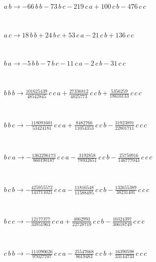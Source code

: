 \begin{minipage}{6in}
$
a\,
 b\rightarrow -66\,
 b\,
 b - 73\,
 b\,
 c - 219\,
 c\,
 a + 100\,
 c\,
 b - 476\,
 c\,
 c
$
\end{minipage}\medskip \\
\begin{minipage}{6in}
$
a\,
 c\rightarrow 18\,
 b\,
 b + 24\,
 b\,
 c + 53\,
 c\,
 a - 21\,
 c\,
 b + 136\,
 c\,
 c
$
\end{minipage}\medskip \\
\begin{minipage}{6in}
$
b\,
 a\rightarrow -5\,
 b\,
 b - 7\,
 b\,
 c - 11\,
 c\,
 a - 2\,
 c\,
 b - 31\,
 c\,
 c
$
\end{minipage}\medskip \\
\begin{minipage}{6in}
$
b\,
 b\,
 b\rightarrow \frac{101625439}{48542845}\,
 c\,
 c\,
 a + \frac{27336812}{4025773}\,
 c\,
 c\,
 b + \frac{5356259}{18616133}\,
 c\,
 c\,
 c
$
\end{minipage}\medskip \\
\begin{minipage}{6in}
$
b\,
 b\,
 c\rightarrow -\frac{118091601}{53424181}\,
 c\,
 c\,
 a + \frac{8482766}{11054353}\,
 c\,
 c\,
 b - \frac{31923891}{22801711}\,
 c\,
 c\,
 c
$
\end{minipage}\medskip \\
\begin{minipage}{6in}
$
b\,
 c\,
 a\rightarrow -\frac{1362296173}{860190187}\,
 c\,
 c\,
 a - \frac{3192858}{78932651}\,
 c\,
 c\,
 b - \frac{25750916}{146777043}\,
 c\,
 c\,
 c
$
\end{minipage}\medskip \\
\begin{minipage}{6in}
$
b\,
 c\,
 b\rightarrow -\frac{425955572}{141711021}\,
 c\,
 c\,
 a - \frac{11816548}{11588495}\,
 c\,
 c\,
 b - \frac{132655389}{38231401}\,
 c\,
 c\,
 c
$
\end{minipage}\medskip \\
\begin{minipage}{6in}
$
b\,
 c\,
 c\rightarrow -\frac{12177377}{33951963}\,
 c\,
 c\,
 a + \frac{4062993}{22728719}\,
 c\,
 c\,
 b - \frac{10324397}{30618749}\,
 c\,
 c\,
 c
$
\end{minipage}\medskip \\
\begin{minipage}{6in}
$
c\,
 b\,
 b\rightarrow -\frac{111090626}{97027707}\,
 c\,
 c\,
 a - \frac{25547668}{8619483}\,
 c\,
 c\,
 b + \frac{16390598}{33144733}\,
 c\,
 c\,
 c
$
\end{minipage}\medskip \\
